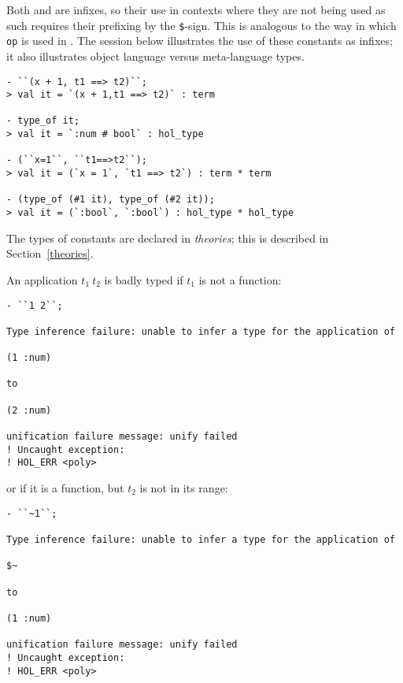 \noindent Both \ml{+} and \ml{==>} are infixes, so their use in
contexts where they are not being used as such requires their
prefixing by the \texttt{\$}-sign.  This is analogous to the way in
which \texttt{op} is used in \ML. The session below illustrates the
use of these constants as infixes; it also illustrates object language
versus meta-language types.

\begin{session}\begin{verbatim}
- ``(x + 1, t1 ==> t2)``;
> val it = `(x + 1,t1 ==> t2)` : term

- type_of it;
> val it = `:num # bool` : hol_type

- (``x=1``, ``t1==>t2``);
> val it = (`x = 1`, `t1 ==> t2`) : term * term

- (type_of (#1 it), type_of (#2 it));
> val it = (`:bool`, `:bool`) : hol_type * hol_type
\end{verbatim}\end{session}

\noindent The types of constants are declared in {\it theories}; this is
described in Section~\ref{theories}.

An application $t_1\ t_2$ is badly typed if $t_1$ is not a function:

\begin{session}\begin{verbatim}
- ``1 2``;

Type inference failure: unable to infer a type for the application of

(1 :num)

to

(2 :num)

unification failure message: unify failed
! Uncaught exception:
! HOL_ERR <poly>
\end{verbatim}\end{session}

\noindent or if it is a function, but $t_2$ is not in its range:

\begin{session}\begin{verbatim}
- ``~1``;

Type inference failure: unable to infer a type for the application of

$~

to

(1 :num)

unification failure message: unify failed
! Uncaught exception:
! HOL_ERR <poly>
\end{verbatim}\end{session}

